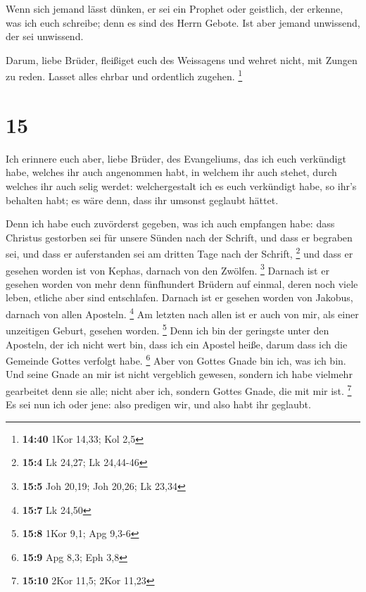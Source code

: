  Wenn sich jemand lässt dünken, er sei ein Prophet oder
geistlich, der erkenne, was ich euch schreibe; denn es sind des Herrn
Gebote.  Ist aber jemand unwissend, der sei unwissend.

 Darum, liebe Brüder, fleißiget euch des Weissagens und
wehret nicht, mit Zungen zu reden.  Lasset alles ehrbar und
ordentlich zugehen. \footnote{\textbf{14:40} 1Kor 14,33; Kol 2,5}

\hypertarget{section-9}{%
\section{15}\label{section-9}}

 Ich erinnere euch aber, liebe Brüder, des Evangeliums, das
ich euch verkündigt habe, welches ihr auch angenommen habt, in welchem
ihr auch stehet,  durch welches ihr auch selig werdet:
welchergestalt ich es euch verkündigt habe, so ihr's behalten habt; es
wäre denn, dass ihr umsonst geglaubt hättet.

 Denn ich habe euch zuvörderst gegeben, was ich auch
empfangen habe: dass Christus gestorben sei für unsere Sünden nach der
Schrift,  und dass er begraben sei, und dass er auferstanden
sei am dritten Tage nach der Schrift, \footnote{\textbf{15:4} Lk 24,27;
  Lk 24,44-46}  und dass er gesehen worden ist von Kephas,
darnach von den Zwölfen. \footnote{\textbf{15:5} Joh 20,19; Joh 20,26;
  Lk 23,34}  Darnach ist er gesehen worden von mehr denn
fünfhundert Brüdern auf einmal, deren noch viele leben, etliche aber
sind entschlafen.  Darnach ist er gesehen worden von
Jakobus, darnach von allen Aposteln. \footnote{\textbf{15:7} Lk 24,50}
 Am letzten nach allen ist er auch von mir, als einer
unzeitigen Geburt, gesehen worden. \footnote{\textbf{15:8} 1Kor 9,1; Apg
  9,3-6}  Denn ich bin der geringste unter den Aposteln, der
ich nicht wert bin, dass ich ein Apostel heiße, darum dass ich die
Gemeinde Gottes verfolgt habe. \footnote{\textbf{15:9} Apg 8,3; Eph 3,8}
 Aber von Gottes Gnade bin ich, was ich bin. Und seine
Gnade an mir ist nicht vergeblich gewesen, sondern ich habe vielmehr
gearbeitet denn sie alle; nicht aber ich, sondern Gottes Gnade, die mit
mir ist. \footnote{\textbf{15:10} 2Kor 11,5; 2Kor 11,23} 
Es sei nun ich oder jene: also predigen wir, und also habt ihr geglaubt.

